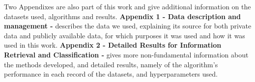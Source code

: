 Two Appendixes are also part of this work and give additional information on the datasets used, algorithms and results. \textbf{Appendix 1 - Data description and management -} describes the data we used, explaining its source for both private data and publicly available data, for which purposes it was used and how it was used in this work. \textbf{Appendix 2 - Detailed Results for Information Retrieval and Classification -} gives more non-fundamental information about the methods developed, and detailed results, namely of the algorithm's performance in each record of the datasets, and hyperparameters used.